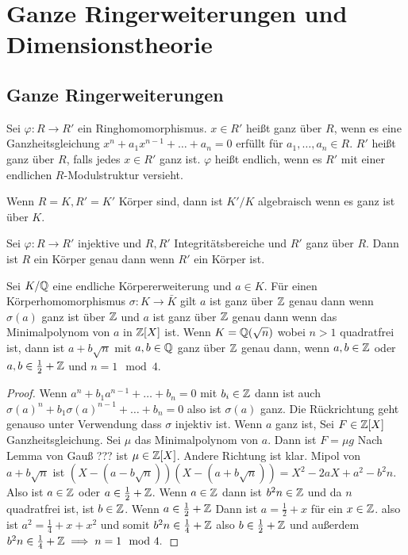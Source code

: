 \chapter{Ganze Ringerweiterungen und Dimensionstheorie}
\section{Ganze Ringerweiterungen}
\begin{Def}
	Sei \(\varphi\colon R\to R'\) ein Ringhomomorphismus. \(x\in R'\) heißt ganz über \(R\), wenn es eine Ganzheitsgleichung \(x^n+a_1x^{n-1}+\dots+a_n=0\) erfüllt für \(a_1,\dots,a_n\in R\).
	\(R'\) heißt ganz über \(R\), falls jedes \(x\in R'\) ganz ist. \(\varphi\) heißt endlich, wenn es \(R'\) mit einer endlichen \(R\)-Modulstruktur versieht.
\end{Def}
\begin{Bsp}
	Wenn \(R=K, R'=K'\) Körper sind, dann ist \(K'/K\) algebraisch wenn es ganz ist über \(K\).
\end{Bsp}
\begin{Lemma}\label{Lem:GanzheitKörper}
	Sei \(\varphi\colon R\to R'\) injektive und \(R,R'\) Integritätsbereiche und \(R'\) ganz über \(R\). Dann ist \(R\) ein Körper genau dann wenn \(R'\) ein Körper ist. 
\end{Lemma}
\begin{Bsp}
	Sei \(K/\mathbb{Q}\) eine endliche Körpererweiterung und \(a\in K\). Für einen Körperhomomorphismus \(\sigma\colon K\to\bar K\) gilt \(a\) ist ganz über \(\mathbb{Z}\) genau dann wenn \(\sigma(a)\) ganz ist über \(\mathbb{Z}\) und \(a\) ist ganz über \(\mathbb{Z}\) genau dann wenn das Minimalpolynom von \(a\) in \(\mathbb{Z}[X]\) ist. Wenn \(K=\mathbb{Q}(\sqrt{n})\) wobei \(n>1\) quadratfrei ist, dann ist \(a+b\sqrt{n}\) mit \(a,b\in \mathbb{Q}\) ganz über \(\mathbb{Z}\) genau dann, wenn \(a,b\in\mathbb{Z}\) oder \(a,b\in\frac 1 2+\mathbb{Z}\) und \(n=1\mod 4\).
\end{Bsp}
\begin{proof}
	Wenn \(a^n+b_1a^{n-1}+\dots+b_n=0\) mit \(b_i\in\mathbb{Z}\) dann ist auch \(\sigma(a)^n+b_1\sigma(a)^{n-1}+\dots+b_n=0\) also ist \(\sigma(a)\) ganz. Die Rückrichtung geht genauso unter Verwendung dass \(\sigma\) injektiv ist.
	Wenn \(a\) ganz ist, Sei \(F\in \mathbb{Z}[X]\) Ganzheitsgleichung. Sei \(\mu\) das Minimalpolynom von \(a\). Dann ist \(F=\mu g\)
	Nach Lemma von Gauß ??? ist \(\mu\in\mathbb{Z}[X]\).
	Andere Richtung ist klar.
	Mipol von \(a+b\sqrt{n}\) ist \((X-(a-b\sqrt{n}))(X-(a+b\sqrt n))=X^2-2aX+a^2-b^2n\).
	Also ist \(a\in \mathbb{Z}\) oder \(a\in  \frac 1 2+\mathbb{Z}\).
	Wenn \(a\in\mathbb{Z}\) dann ist \(b^2n\in\mathbb{Z}\) und da \(n\) quadratfrei ist, ist \(b\in\mathbb{Z}\). 
	Wenn \(a\in \frac 1 2+\mathbb{Z}\) Dann ist \(a=\frac 1 2+x\) für ein \(x\in\mathbb{Z}\).
	also ist \(a^2=\frac 1 4+x+x^2\) und somit \(b^2n\in \frac 1 4+\mathbb{Z}\) also \(b\in \frac 1 2+\mathbb{Z}\) und außerdem \(b^2n\in \frac 1 4+\mathbb{Z}\implies n=1\mod 4.\)
\end{proof}
